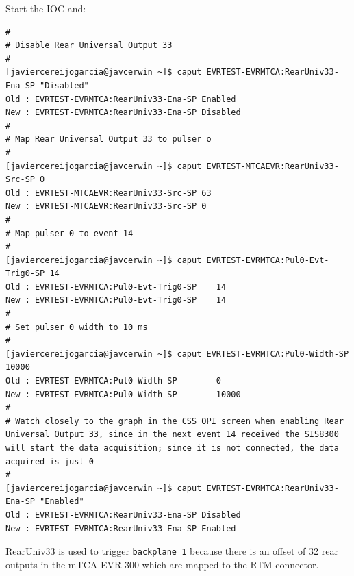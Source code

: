 \documentclass[11pt
  , a4paper
  , article
  , oneside
  , showtrims
]{memoir}
\begin{document}
Start the IOC and:
\begin{lstlisting}[style=termstyle]
#
# Disable Rear Universal Output 33
# 
[javiercereijogarcia@javcerwin ~]$ caput EVRTEST-EVRMTCA:RearUniv33-Ena-SP "Disabled"
Old : EVRTEST-EVRMTCA:RearUniv33-Ena-SP Enabled
New : EVRTEST-EVRMTCA:RearUniv33-Ena-SP Disabled
#
# Map Rear Universal Output 33 to pulser o
#
[javiercereijogarcia@javcerwin ~]$ caput EVRTEST-MTCAEVR:RearUniv33-Src-SP 0
Old : EVRTEST-MTCAEVR:RearUniv33-Src-SP 63
New : EVRTEST-MTCAEVR:RearUniv33-Src-SP 0
#
# Map pulser 0 to event 14
#
[javiercereijogarcia@javcerwin ~]$ caput EVRTEST-EVRMTCA:Pul0-Evt-Trig0-SP 14
Old : EVRTEST-EVRMTCA:Pul0-Evt-Trig0-SP    14
New : EVRTEST-EVRMTCA:Pul0-Evt-Trig0-SP    14
#
# Set pulser 0 width to 10 ms
#
[javiercereijogarcia@javcerwin ~]$ caput EVRTEST-EVRMTCA:Pul0-Width-SP 10000
Old : EVRTEST-EVRMTCA:Pul0-Width-SP        0
New : EVRTEST-EVRMTCA:Pul0-Width-SP        10000
#
# Watch closely to the graph in the CSS OPI screen when enabling Rear Universal Output 33, since in the next event 14 received the SIS8300 will start the data acquisition; since it is not connected, the data acquired is just 0
#
[javiercereijogarcia@javcerwin ~]$ caput EVRTEST-EVRMTCA:RearUniv33-Ena-SP "Enabled"
Old : EVRTEST-EVRMTCA:RearUniv33-Ena-SP Disabled
New : EVRTEST-EVRMTCA:RearUniv33-Ena-SP Enabled
\end{lstlisting}
RearUniv33 is used to trigger \texttt{backplane 1} because there is an offset of 32 rear outputs in the mTCA-EVR-300 which are mapped to the RTM connector.

\clearpage

\backmatter
%
%
%

%
%

\end{document}
